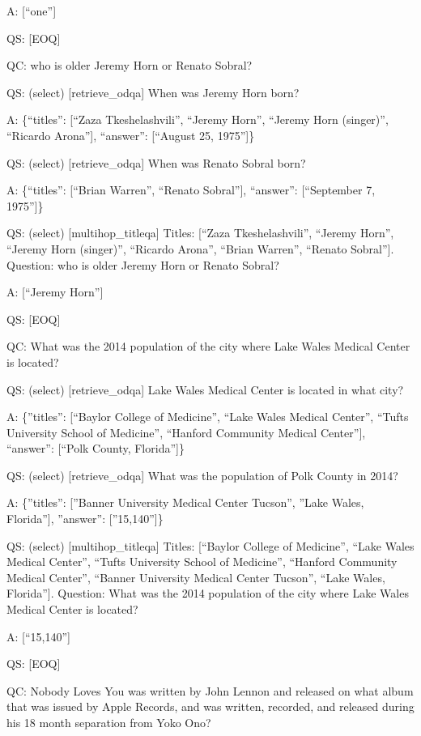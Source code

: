 \documentclass[
]{article}
\begin{document}
A: {[}``one''{]}

QS: {[}EOQ{]}

QC: who is older Jeremy Horn or Renato Sobral?

QS: (select) {[}retrieve\_odqa{]} When was Jeremy Horn born?

A: \{``titles'': {[}``Zaza Tkeshelashvili'', ``Jeremy Horn'', ``Jeremy
Horn (singer)'', ``Ricardo Arona''{]}, ``answer'': {[}``August 25,
1975''{]}\}

QS: (select) {[}retrieve\_odqa{]} When was Renato Sobral born?

A: \{``titles'': {[}``Brian Warren'', ``Renato Sobral''{]}, ``answer'':
{[}``September 7, 1975''{]}\}

QS: (select) {[}multihop\_titleqa{]} Titles: {[}``Zaza Tkeshelashvili'',
``Jeremy Horn'', ``Jeremy Horn (singer)'', ``Ricardo Arona'', ``Brian
Warren'', ``Renato Sobral''{]}. Question: who is older Jeremy Horn or
Renato Sobral?

A: {[}``Jeremy Horn''{]}

QS: {[}EOQ{]}

QC: What was the 2014 population of the city where Lake Wales Medical
Center is located?

QS: (select) {[}retrieve\_odqa{]} Lake Wales Medical Center is located
in what city?

A: \{''titles'': {[}``Baylor College of Medicine'', ``Lake Wales Medical
Center'', ``Tufts University School of Medicine'', ``Hanford Community
Medical Center''{]}, ``answer'': {[}``Polk County, Florida''{]}\}

QS: (select) {[}retrieve\_odqa{]} What was the population of Polk County
in 2014?

A: \{''titles'': {[}''Banner University Medical Center Tucson'', ''Lake
Wales, Florida''{]}, ''answer'': {[}''15,140''{]}\}

QS: (select) {[}multihop\_titleqa{]} Titles: {[}``Baylor College of
Medicine'', ``Lake Wales Medical Center'', ``Tufts University School of
Medicine'', ``Hanford Community Medical Center'', ``Banner University
Medical Center Tucson'', ``Lake Wales, Florida''{]}. Question: What was
the 2014 population of the city where Lake Wales Medical Center is
located?

A: {[}``15,140''{]}

QS: {[}EOQ{]}

QC: Nobody Loves You was written by John Lennon and released on what
album that was issued by Apple Records, and was written, recorded, and
released during his 18 month separation from Yoko Ono?
\end{document}
